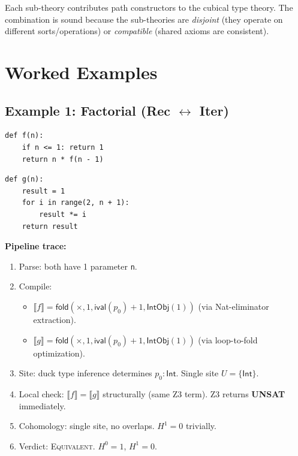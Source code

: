 \documentclass[11pt,a4paper]{report}
\theoremstyle{definition}
\theoremstyle{plain}
\newcommand{\den}[1]{\llbracket #1 \rrbracket}     %
\newcommand{\fold}{\mathsf{fold}}
\newcommand{\Hzero}{H^0}
\newcommand{\Hone}{H^1}
\begin{document}
Each sub-theory contributes path constructors to the cubical type
theory.  The combination is sound because the sub-theories are
\emph{disjoint} (they operate on different sorts/operations) or
\emph{compatible} (shared axioms are consistent).


\chapter{Worked Examples}
\label{ch:examples}

\section{Example 1: Factorial (Rec $\leftrightarrow$ Iter)}

\begin{lstlisting}[caption={Recursive factorial}]
def f(n):
    if n <= 1: return 1
    return n * f(n - 1)
\end{lstlisting}

\begin{lstlisting}[caption={Iterative factorial}]
def g(n):
    result = 1
    for i in range(2, n + 1):
        result *= i
    return result
\end{lstlisting}

\textbf{Pipeline trace:}
\begin{enumerate}
  \item Parse: both have 1 parameter \texttt{n}.
  \item Compile:
    \begin{itemize}
      \item $\den{f} = \fold(\times, 1, \mathsf{ival}(p_0)+1,
        \mathsf{IntObj}(1))$ (via Nat-eliminator extraction).
      \item $\den{g} = \fold(\times, 1, \mathsf{ival}(p_0)+1,
        \mathsf{IntObj}(1))$ (via loop-to-fold optimization).
    \end{itemize}
  \item Site: duck type inference determines $p_0 : \mathsf{Int}$.
    Single site $U = \{\mathsf{Int}\}$.
  \item Local check: $\den{f} = \den{g}$ structurally (same Z3 term).
    Z3 returns \textbf{UNSAT} immediately.
  \item Cohomology: single site, no overlaps.  $\Hone = 0$ trivially.
  \item Verdict: \textsc{Equivalent}.  $\Hzero = 1$, $\Hone = 0$.
\end{enumerate}
\end{document}
